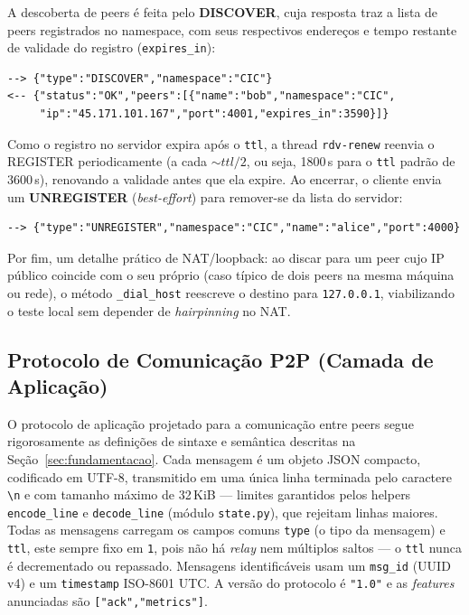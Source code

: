 \documentclass[12pt, a4paper]{article}
\begin{document}
A descoberta de peers é feita pelo \textbf{DISCOVER}, cuja resposta traz a lista de peers registrados no namespace, com seus respectivos endereços e tempo restante de validade do registro (\texttt{expires\_in}):

\begin{lstlisting}[style=terminal]
--> {"type":"DISCOVER","namespace":"CIC"}
<-- {"status":"OK","peers":[{"name":"bob","namespace":"CIC",
     "ip":"45.171.101.167","port":4001,"expires_in":3590}]}
\end{lstlisting}

Como o registro no servidor expira após o \texttt{ttl}, a thread \texttt{rdv-renew} reenvia o REGISTER periodicamente (a cada $\sim ttl/2$, ou seja, 1800\,s para o \texttt{ttl} padrão de 3600\,s), renovando a validade antes que ela expire. Ao encerrar, o cliente envia um \textbf{UNREGISTER} (\textit{best-effort}) para remover-se da lista do servidor:

\begin{lstlisting}[style=terminal]
--> {"type":"UNREGISTER","namespace":"CIC","name":"alice","port":4000}
\end{lstlisting}

Por fim, um detalhe prático de NAT/loopback: ao discar para um peer cujo IP público coincide com o seu próprio (caso típico de dois peers na mesma máquina ou rede), o método \texttt{\_dial\_host} reescreve o destino para \texttt{127.0.0.1}, viabilizando o teste local sem depender de \textit{hairpinning} no NAT.

\subsection{Protocolo de Comunicação P2P (Camada de Aplicação)}
O protocolo de aplicação projetado para a comunicação entre peers segue rigorosamente as definições de sintaxe e semântica descritas na Seção~\ref{sec:fundamentacao}. Cada mensagem é um objeto JSON compacto, codificado em UTF-8, transmitido em uma única linha terminada pelo caractere \verb|\n| e com tamanho máximo de 32\,KiB --- limites garantidos pelos helpers \texttt{encode\_line} e \texttt{decode\_line} (módulo \texttt{state.py}), que rejeitam linhas maiores. Todas as mensagens carregam os campos comuns \texttt{type} (o tipo da mensagem) e \texttt{ttl}, este sempre fixo em \texttt{1}, pois não há \textit{relay} nem múltiplos saltos --- o \texttt{ttl} nunca é decrementado ou repassado. Mensagens identificáveis usam um \texttt{msg\_id} (UUID v4) e um \texttt{timestamp} ISO-8601 UTC. A versão do protocolo é \texttt{"1.0"} e as \textit{features} anunciadas são \texttt{["ack","metrics"]}.
\end{document}
